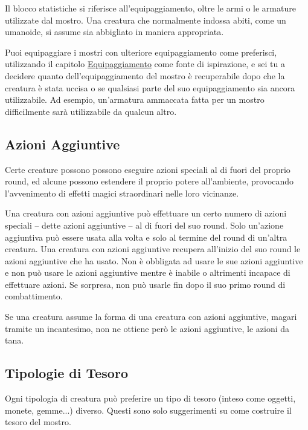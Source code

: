 \documentclass[12pt,a4paper,twoside,openany]{book}
\begin{document}
\begin{multicols}{2}
Il blocco statistiche si riferisce all'equipaggiamento, oltre le armi o le armature utilizzate dal mostro. Una creatura che normalmente indossa abiti, come un umanoide, si assume sia abbigliato in maniera appropriata.

Puoi equipaggiare i mostri con ulteriore equipaggiamento come preferisci, utilizzando il capitolo \hyperlink{equipaggiamento}{Equipaggiamento} come fonte di ispirazione, e sei tu a decidere quanto dell'equipaggiamento del mostro è recuperabile dopo che la creatura è stata uccisa o se qualsiasi parte del suo equipaggiamento sia ancora utilizzabile. Ad esempio, un'armatura ammaccata fatta per un mostro difficilmente sarà utilizzabile da qualcun altro. 

\subsection{Azioni Aggiuntive}

Certe creature possono possono eseguire azioni speciali al di fuori del proprio round, ed alcune possono estendere il proprio potere all'ambiente, provocando l'avvenimento di effetti magici straordinari nelle loro vicinanze.

Una creatura con azioni aggiuntive può effettuare un certo numero di azioni speciali -- dette azioni aggiuntive -- al di fuori del suo round. Solo un'azione aggiuntiva può essere usata alla volta e solo al termine del round di un'altra creatura. Una creatura con azioni aggiuntive recupera all'inizio del suo round le azioni aggiuntive che ha usato. Non è obbligata ad usare le sue azioni aggiuntive e non può usare le azioni aggiuntive mentre è inabile o altrimenti incapace di effettuare azioni. Se sorpresa, non può usarle fin dopo il suo primo round di combattimento.

Se una creatura assume la forma di una creatura con azioni aggiuntive, magari tramite un incantesimo, non ne ottiene però le azioni aggiuntive, le azioni da tana.



\subsection{Tipologie di Tesoro}

Ogni tipologia di creatura può preferire un tipo di tesoro (inteso come oggetti, monete, gemme...) diverso. Questi sono solo suggerimenti su come costruire il tesoro del mostro.

\medskip


\end{multicols}
\end{document}
